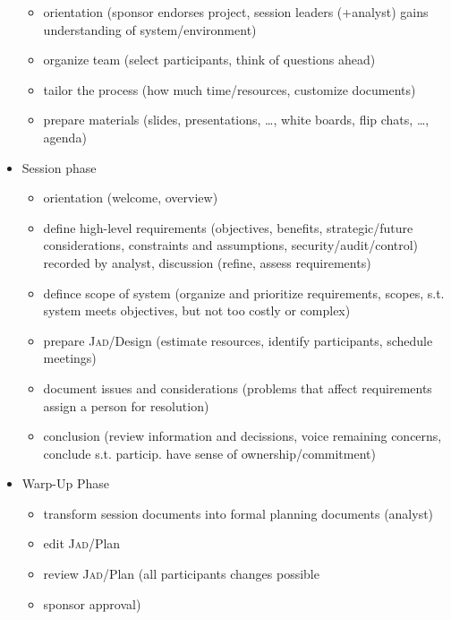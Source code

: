 \documentclass[a4paper, 10pt]{article}
\begin{document}
\begin{itemize}
\begin{itemize}
		\item orientation (sponsor endorses project, session leaders (+analyst) gains understanding of system/environment)
		\item organize team (select participants, think of questions ahead)
		\item tailor the process (how much time/resources, customize documents)
		\item prepare materials (slides, presentations, \dots, white boards, flip chats, \dots, agenda)
	\end{itemize}
	\item Session phase
	\begin{itemize}
		\item orientation (welcome, overview)
		\item define high-level requirements (objectives, benefits, strategic/future considerations, constraints and assumptions, security/audit/control) \follows recorded by analyst, discussion (refine, assess requirements)
		\item defince scope of system (organize and prioritize requirements, scopes, s.t. system meets objectives, but not too costly or complex)
		\item prepare \textsc{Jad}/Design (estimate resources, identify participants, schedule meetings)
		\item document issues and considerations (problems that affect requirements \follows assign a person for resolution)
		\item conclusion (review information and decissions, voice remaining concerns, conclude s.t. particip. have sense of ownership/commitment)
	\end{itemize}
	\item Warp-Up Phase
	\begin{itemize}
		\item transform session documents into formal planning documents (analyst)
		\item edit \textsc{Jad}/Plan
		\item review \textsc{Jad}/Plan (all participants \follows changes possible
		\item sponsor approval)
	\end{itemize}
\end{itemize}
\end{document}

